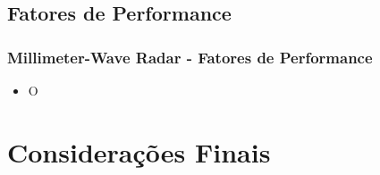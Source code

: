 \documentclass[xcolor=dvipsnames, aspectratio=169]{beamer}
\begin{document}
    \subsection[Introdução]{Fatores de Performance} 
    \begin{frame}
    \frametitle{Millimeter-Wave Radar - Fatores de Performance}
        \begin{itemize}
            \item O
        \end{itemize}
    \end{frame}

\section[Considerações Finais]{Considerações Finais} 
\end{document}
